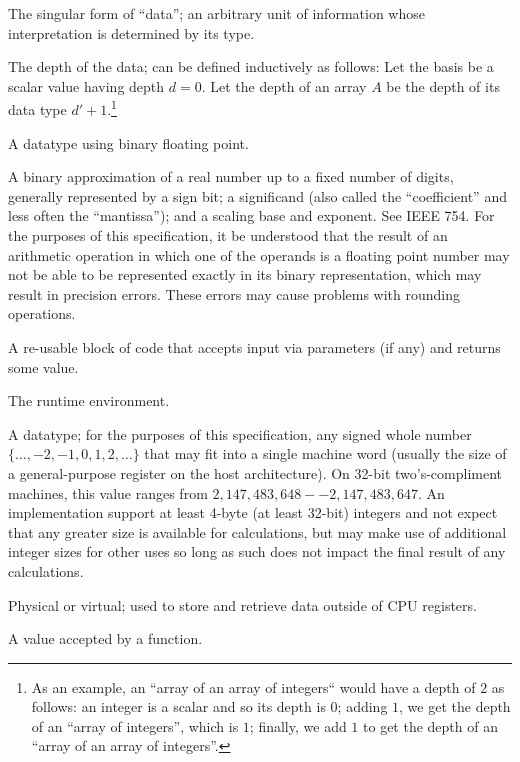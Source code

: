 \begin{description}
  The singular form of ``data''; an arbitrary unit of information whose
  interpretation is determined by its type.

  The depth of the data; can be defined inductively as follows: Let the basis be
  a scalar value having depth $d=0$. Let the depth of an array $A$ be the depth
  of its data type $d'+1$.\footnote{As an example, an ``array of an array of
  integers`` would have a depth of $2$ as follows: an integer is a scalar and so
  its depth is $0$; adding $1$, we get the depth of an ``array of integers'',
  which is $1$; finally, we add $1$ to get the depth of an ``array of an array
  of integers''.}

  A datatype using binary floating point.

  A binary approximation of a real number up to a fixed number of digits,
  generally represented by a sign bit; a significand (also called the
  ``coefficient'' and less often the ``mantissa''); and a scaling base and
  exponent. See IEEE 754. For the purposes of this specification, it \shall be
  understood that the result of an arithmetic operation in which one of the
  operands is a floating point number may not be able to be represented exactly
  in its binary representation, which may result in precision errors. These
  errors may cause problems with rounding operations.

  A re-usable block of code that accepts input via parameters (if any) and
  returns some value.

  The runtime environment.

  A datatype; for the purposes of this specification, any signed whole number
  $\{\ldots, -2, -1, 0, 1, 2, \ldots\}$ that may fit into a single machine word
  (usually the size of a general-purpose register on the host architecture). On
  32-bit two's-compliment machines, this value ranges from
  $2,147,483,648--2,147,483,647$. An implementation \shall support at least
  4-byte (at least 32-bit) integers and \shall not expect that any greater size
  is available for calculations, but may make use of additional integer sizes
  for other uses so long as such does not impact the final result of any
  calculations.

  Physical or virtual; used to store and retrieve data outside of CPU registers.

  A value accepted by a function.


\end{description}
